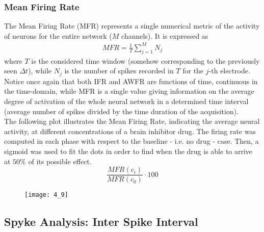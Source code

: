 \subsubsection{Mean Firing Rate}
The Mean Firing Rate (MFR) represents a single numerical metric of the activity of neurons
for the entire network (\(M\) channels). It is expressed as
\begin{align*}
    MFR=\frac{1}{T}\sum_{j=1}^{M}N_j
\end{align*}
where \(T\) is the considered time window (somehow corresponding to the previously seen
\(\Delta{t}\)), while \(N_j\) is the number of spikes recorded in \(T\) for the \(j\)-th
electrode.\\
Notice once again that both IFR and AWFR are functions of time, continuous in the time-domain,
while MFR is a single value giving information on the average degree of activation of the
whole neural network in a determined time interval (average number of spikes divided by the
time duration of the acquisition).\\
The following plot illustrates the Mean Firing Rate, indicating the average neural activity, at
different concentrations of a brain inhibitor drug. The firing rate was computed in each phase
with respect to the baseline - i.e. no drug - case. Then, a sigmoid was used to fit the dots
in order to find when the drug is able to arrive at \(50\%\) of its possible effect.
\begin{equation*}
    \frac{MFR(c_i)}{MFR(c_0)}\cdot100
\end{equation*}
\begin{figure}[H]
    \texttt{[image: 4\_9]}
    \centering
\end{figure}

\subsection{Spyke Analysis: Inter Spike Interval}
